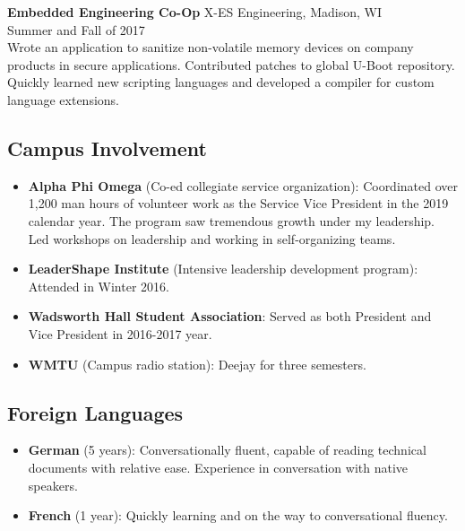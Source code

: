 \documentclass[11pt]{article}
\begin{document}
\vspace{12pt}
\textbf{Embedded Engineering Co-Op}
\hfill
X-ES Engineering, Madison, WI\\
Summer and Fall of 2017\\
Wrote an application to sanitize non-volatile memory devices on company
products in secure applications. Contributed patches to global U-Boot
repository. Quickly learned new scripting languages and developed a compiler
for custom language extensions.


\subsection*{Campus Involvement}
\begin{itemize}
\item \textbf{Alpha Phi Omega} (Co-ed collegiate service organization):
  Coordinated over 1,200 man hours of volunteer work as the Service Vice
  President in the 2019 calendar year. The program saw tremendous growth under
  my leadership. Led workshops on leadership and working in self-organizing
  teams.
\item \textbf{LeaderShape Institute} (Intensive leadership development
  program): Attended in Winter 2016.
\item \textbf{Wadsworth Hall Student Association}: Served as both President and
  Vice President in 2016-2017 year.
\item \textbf{WMTU} (Campus radio station): Deejay for three semesters.
\end{itemize}

\subsection*{Foreign Languages}
\begin{itemize}
\item \textbf{German} (5 years): Conversationally fluent, capable of reading
  technical documents with relative ease. Experience in conversation with
  native speakers.
\item \textbf{French} (1 year): Quickly learning and on the way to
  conversational fluency.
\end{itemize}
\end{document}
